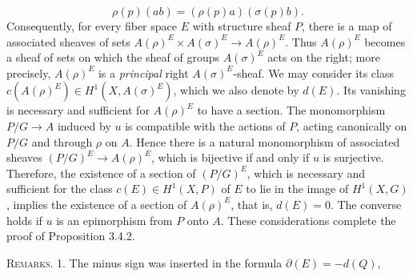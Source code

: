 \[
\rho(p)(ab)=(\rho(p)a)(\sigma(p)b).
\]
Consequently, for every fiber space $E$ with structure sheaf $P$, there is a
map of associated sheaves of sets
$A(\rho)^E\times A(\sigma)^E\to A(\rho)^E$.
Thus $A(\rho)^E$ becomes a sheaf of sets on which the sheaf of groups
$A(\sigma)^E$ acts on the right; more precisely, $A(\rho)^E$ is a \textit{principal}
right $A(\sigma)^E$-sheaf.
We may consider its class
$c(A(\rho)^E)\in H^1(X,A(\sigma)^E)$,
which we also denote by $d(E)$. Its vanishing is necessary and sufficient for
$A(\rho)^E$ to have a section. The monomorphism $P/G\to A$
induced by $u$ is compatible with the actions of $P$, acting canonically on
$P/G$ and through $\rho$ on $A$. Hence there is a natural monomorphism of
associated sheaves
$(P/G)^E\to A(\rho)^E$,
which is bijective if and only if $u$ is surjective.
Therefore, the existence of a section of $(P/G)^E$, which is necessary and
sufficient for the class $c(E)\in H^1(X,P)$ of $E$ to lie in the image of
$H^1(X,G)$, implies the existence of a section of $A(\rho)^E$, that is,
$d(E)=0$. The converse holds if $u$ is an epimorphism from $P$ onto $A$.
These considerations complete the proof of Proposition 3.4.2.

\indent\textsc{Remarks.} 1. The minus sign was inserted in the formula
$\partial(E)=-d(Q)$,

